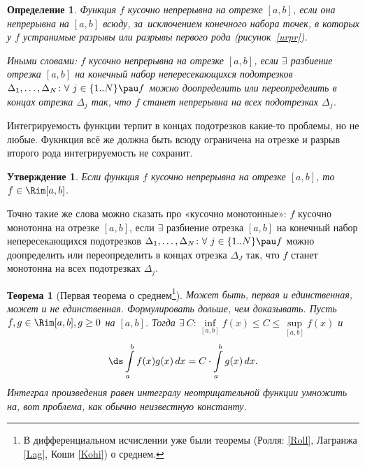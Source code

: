 \documentclass[a4paper,10pt,twoside]{article}
\newtheorem{Def}{Определение}[section]
\newtheorem{The}{Теорема}[section]
\newtheorem{Ut}{Утверждение}[section]
\begin{document}
 \begin{Def}
 	Функция $f$ кусочно непрерывна на отрезке $[a,b]$, если она непрерывна на $[a,b]$ всюду, за~исключением
 	конечного набора точек, в которых у $f$ устранимые разрывы или разрывы первого рода (рисунок~\ref{urpr}).
 	
 	
 	Иными словами: $f$ кусочно непрерывна на отрезке $[a,b]$, если $\exists$ разбиение отрезка $[a,b]$ на конечный набор
 	непересекающихся подотрезков $\Delta_1,\ldots,\Delta_N\colon\forall\  j\in\{1..N\}\pau f$ можно
 	доопределить или переопределить в концах отрезка $\Delta_j$ так, что $f$ станет непрерывна на всех подотрезках $\Delta_j$.
 \end{Def}
 
 Интегрируемость функции терпит в концах подотрезков какие-то проблемы, но не любые. Фукнкция всё же должна быть 
 всюду ограничена на отрезке и разрыв второго рода интегрируемость не сохранит.
 
 \begin{Ut}
 	Если функция $f$ кусочно непрерывна на отрезке $[a,b]$, то $f\in\Rim[a,b]$.
 \end{Ut}
 
 Точно такие же слова можно сказать про «кусочно монотонные»:  $f$ кусочно монотонна на отрезке $[a,b]$, если $\exists$ разбиение отрезка $[a,b]$ на конечный набор
 	непересекающихся подотрезков $\Delta_1,\ldots,\Delta_N\colon\forall\  j\in\{1..N\}\pau f$ можно
 	доопределить или переопределить в концах отрезка $\Delta_J$ так, что $f$ станет монотонна на всех подотрезках $\Delta_j$.
 	
 	\begin{The}[Первая теорема о среднем\footnote{В дифференциальном исчислении уже были теоремы (Ролля: \ref{Roll}, Лагранжа \ref{Lag}, Коши \ref{Kohi}) о среднем.}]
 	\label{FirTheMid}Может быть, первая и единственная, может и не единственная. Формулировать дольше, чем доказывать. Пусть $f,g\in\Rim[a,b], g\geq0$ на $[a,b]$. Тогда
 	$\exists\  C\colon\inf\limits_{[a,b]}f(x)\leq C\leq \sup\limits_{[a,b]}f(x)$ и
 	$$\ds\int\limits_a^bf(x)g(x)\,dx=C\cdot\int\limits_a^bg(x)\,dx.$$
 	Интеграл произведения равен интегралу неотрицательной функции умножить на, вот проблема, как обычно неизвестную константу.
 	\end{The}
 	
\end{document}
